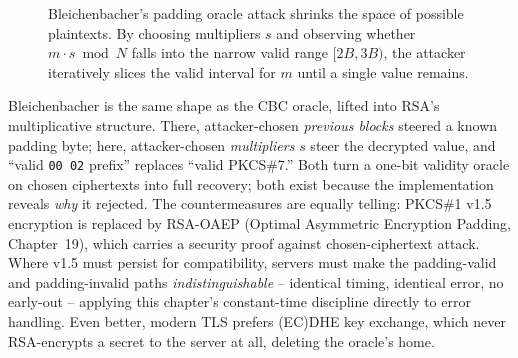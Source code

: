 \begin{figure}[H]
\centering
{}
\caption{Bleichenbacher's padding oracle attack shrinks the space of possible plaintexts. By choosing multipliers $s$ and observing whether $m \cdot s \bmod N$ falls into the narrow valid range $[2B, 3B)$, the attacker iteratively slices the valid interval for $m$ until a single value remains.}
\label{ch37:fig-bleichenbacher}
\end{figure}
\begin{whybox}
Bleichenbacher is the same shape as the CBC oracle, lifted into RSA's multiplicative structure. There, attacker-chosen \emph{previous blocks} steered a known padding byte; here, attacker-chosen \emph{multipliers} $s$ steer the decrypted value, and ``valid \texttt{00 02} prefix'' replaces ``valid PKCS\#7.'' Both turn a one-bit validity oracle on chosen ciphertexts into full recovery; both exist because the implementation reveals \emph{why} it rejected. The countermeasures are equally telling: PKCS\#1 v1.5 encryption is replaced by RSA-OAEP (Optimal Asymmetric Encryption Padding, Chapter~19), which carries a security proof against chosen-ciphertext attack. Where v1.5 must persist for compatibility, servers must make the padding-valid and padding-invalid paths \emph{indistinguishable} -- identical timing, identical error, no early-out -- applying this chapter's constant-time discipline directly to error handling. Even better, modern TLS prefers (EC)DHE key exchange, which never RSA-encrypts a secret to the server at all, deleting the oracle's home.
\end{whybox}


